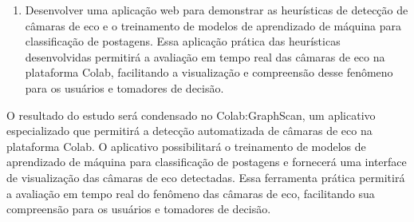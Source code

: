 \begin{enumerate}
	\item Desenvolver uma aplicação web para demonstrar as heurísticas de detecção de câmaras de eco e o treinamento de modelos de aprendizado de máquina para classificação de postagens. Essa aplicação prática das heurísticas desenvolvidas permitirá a avaliação em tempo real das câmaras de eco na plataforma Colab, facilitando a visualização e compreensão desse fenômeno para os usuários e tomadores de decisão.
\end{enumerate}

O resultado do estudo será condensado no Colab:GraphScan, um aplicativo especializado que permitirá a detecção automatizada de câmaras de eco na plataforma Colab. O aplicativo possibilitará o treinamento de modelos de aprendizado de máquina para classificação de postagens e fornecerá uma interface de visualização das câmaras de eco detectadas. Essa ferramenta prática permitirá a avaliação em tempo real do fenômeno das câmaras de eco, facilitando sua compreensão para os usuários e tomadores de decisão.